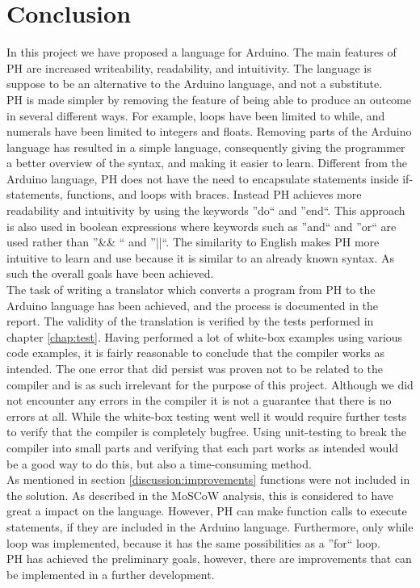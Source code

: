 \section{Conclusion}

In this project we have proposed a language for Arduino. The main features of PH are increased writeability, readability, and intuitivity. The language is suppose to be an alternative to the Arduino language, and not a substitute.\\

PH is made simpler by removing the feature of being able to produce an outcome in several different ways. For example, loops have been limited to while, and numerals have been limited to integers and floats. Removing parts of the Arduino language has resulted in a simple language, consequently giving the programmer a better overview of the syntax, and making it easier to learn. Different from the Arduino language, PH does not have the need to encapsulate statements inside if-statements, functions, and loops with braces. Instead PH achieves more readability and intuitivity by using the keywords ''do`` and ''end``. This approach is also used in boolean expressions where keywords such as ''and`` and ''or`` are used rather than ''\&\& `` and ''||``. The similarity to English makes PH more intuitive to learn and use because it is similar to an already known syntax. As such the overall goals have been achieved. \\
The task of writing a translator which converts a program from PH to the Arduino language has been achieved, and the process is documented in the report. The validity of the translation is verified by the tests performed in
chapter \ref{chap:test}. Having performed a lot of white-box examples using various code examples, it is fairly reasonable to conclude that the compiler works as intended. The one error that did persist was proven not to be related to the compiler and is as such irrelevant for the purpose of this project. Although we did not encounter any errors in the compiler it is not a guarantee that there is no errors at all. While the white-box testing went well it would require further tests to verify that the compiler is completely bugfree. Using unit-testing to break the compiler into small parts and verifying that each part works as intended would be a good way to do this, but also a time-consuming method. \\
As mentioned in section \ref{discussion:improvements} functions were not included in the solution. As described in the MoSCoW analysis, this is considered to have great a impact on the language. However, PH can make function calls to execute statements, if they are included in the Arduino language. Furthermore, only while loop was implemented, because it has the same possibilities as a ''for`` loop. \\

PH has achieved the preliminary goals, however, there are improvements that can be implemented in a further development.\\
